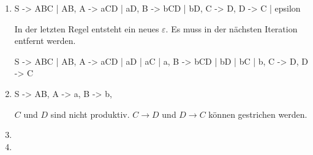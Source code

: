 \documentclass{bschlangaul-aufgabe}
\begin{document}
\begin{enumerate}
\begin{bAntwort}
\begin{enumerate}
\item {}

\begin{bProduktionsRegeln}
S -> ABC | AB,
A -> aCD | aD,
B -> bCD | bD,
C -> D,
D -> C | epsilon
\end{bProduktionsRegeln}

In der letzten Regel entsteht ein neues $\varepsilon$. Es muss in der
nächsten Iteration entfernt werden.

\begin{bProduktionsRegeln}
S -> ABC | AB,
A -> aCD | aD | aC | a,
B -> bCD | bD | bC | b,
C -> D,
D -> C
\end{bProduktionsRegeln}

\item {}

\begin{bProduktionsRegeln}
S -> AB,
A -> a,
B -> b,
\end{bProduktionsRegeln}

$C$ und $D$ sind nicht produktiv. $C \rightarrow D$ und $D \rightarrow
C$ können gestrichen werden.

\item {}

\bNichtsZuTun

\item {}

\bNichtsZuTun
\end{enumerate}
\end{bAntwort}
\end{enumerate}
\end{document}
